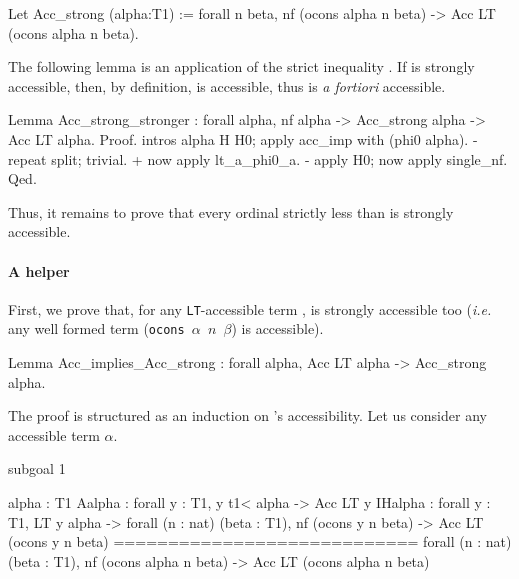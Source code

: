 \begin{Coqsrc}
 Let Acc_strong (alpha:T1) :=
      forall n beta, 
        nf (ocons alpha n beta) -> Acc LT (ocons alpha  n beta).
\end{Coqsrc}

The following lemma is an application of the strict inequality 
\showmath{\alpha < \omega ^\alpha}. If \showmath{\alpha} is strongly accessible, then, by definition, \showmath{\omega^\alpha} is accessible, thus \showmath{\alpha} is \emph{a fortiori} accessible.

\begin{Coqsrc}
 Lemma Acc_strong_stronger : forall alpha, 
     nf alpha -> Acc_strong  alpha -> Acc LT  alpha.
 Proof.
  intros alpha H H0; apply acc_imp with (phi0 alpha).
  - repeat split; trivial.
    + now apply lt_a_phi0_a.
  -  apply H0;  now apply single_nf.
Qed.
\end{Coqsrc}

Thus, it remains to prove that every ordinal strictly less than  
is strongly accessible.


\label{sec:orgheadline81}
\label{proof-wf-epsilon0}
\paragraph{A helper}
\label{sec:orgheadline79}

First, we prove that, for  any \texttt{LT}-accessible term \showmath{\alpha}, \showmath{\alpha} is 
strongly accessible too (\emph{i.e.} any well formed
term (\texttt{ocons $\alpha$ $n$ $\beta$})  is accessible).

\begin{Coqsrc}
Lemma Acc_implies_Acc_strong : 
   forall alpha, Acc LT  alpha -> Acc_strong alpha.
\end{Coqsrc}


The proof is structured as an induction on \showmath{\alpha}'s accessibility. Let us consider
any  accessible term $\alpha$.



\begin{Coqanswer}
  subgoal 1 

  alpha : T1
  Aalpha : forall y : T1,  y t1< alpha -> Acc LT y
  IHalpha : forall y : T1,
       LT y alpha ->
       forall (n : nat) (beta : T1),
       nf (ocons y n beta) -> Acc LT (ocons y n beta)
  ============================
   forall (n : nat) (beta : T1),
   nf (ocons alpha n beta) -> Acc LT (ocons alpha n beta)
\end{Coqanswer}


